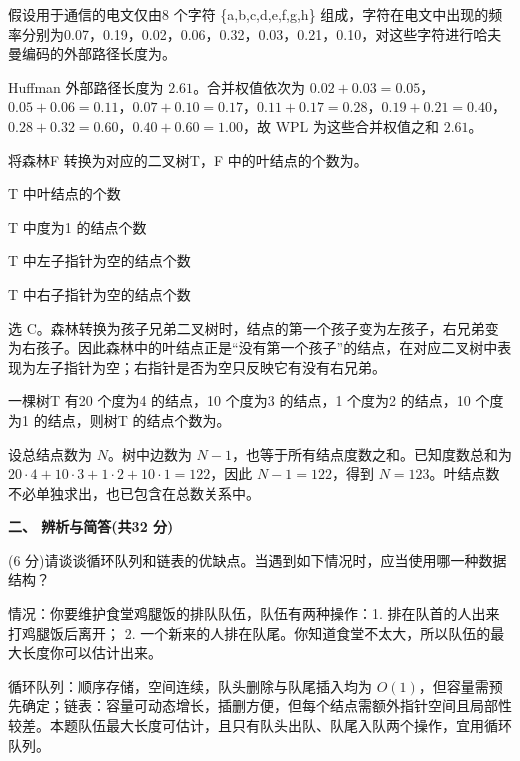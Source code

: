 \begin{question}
假设用于通信的电文仅由8 个字符 \{a,b,c,d,e,f,g,h\} 组成，字符在电文中出现的频率分别为0.07，0.19，0.02，0.06，0.32，0.03，0.21，0.10，对这些字符进行哈夫曼编码的外部路径长度为\blank。
\begin{solution}
Huffman 外部路径长度为 $2.61$。合并权值依次为 $0.02+0.03=0.05$，$0.05+0.06=0.11$，$0.07+0.10=0.17$，$0.11+0.17=0.28$，$0.19+0.21=0.40$，$0.28+0.32=0.60$，$0.40+0.60=1.00$，故 WPL 为这些合并权值之和 $2.61$。
\end{solution}
\end{question}

\begin{question}
将森林F 转换为对应的二叉树T，F 中的叶结点的个数为\blank。
\begin{choiceoptions}[1]
  \item T 中叶结点的个数
  \item T 中度为1 的结点个数
  \item T 中左子指针为空的结点个数
  \item T 中右子指针为空的结点个数
\end{choiceoptions}
\begin{solution}
选 C。森林转换为孩子兄弟二叉树时，结点的第一个孩子变为左孩子，右兄弟变为右孩子。因此森林中的叶结点正是“没有第一个孩子”的结点，在对应二叉树中表现为左子指针为空；右指针是否为空只反映它有没有右兄弟。
\end{solution}
\end{question}

\begin{question}
一棵树T 有20 个度为4 的结点，10 个度为3 的结点，1 个度为2 的结点，10 个度为1 的结点，则树T 的结点个数为\blank。
\begin{solution}
设总结点数为 $N$。树中边数为 $N-1$，也等于所有结点度数之和。已知度数总和为 $20\cdot4+10\cdot3+1\cdot2+10\cdot1=122$，因此 $N-1=122$，得到 $N=123$。叶结点数不必单独求出，也已包含在总数关系中。
\end{solution}
\end{question}

\textbf{二、 辨析与简答(共32 分)}
\begin{question}
(6 分)请谈谈循环队列和链表的优缺点。当遇到如下情况时，应当使用哪一种数据结构？

情况：你要维护食堂鸡腿饭的排队队伍，队伍有两种操作：1. 排在队首的人出来打鸡腿饭后离开； 2. 一个新来的人排在队尾。你知道食堂不太大，所以队伍的最大长度你可以估计出来。
\begin{solution}
循环队列：顺序存储，空间连续，队头删除与队尾插入均为 $O(1)$，但容量需预先确定；链表：容量可动态增长，插删方便，但每个结点需额外指针空间且局部性较差。本题队伍最大长度可估计，且只有队头出队、队尾入队两个操作，宜用循环队列。
\end{solution}
\end{question}

